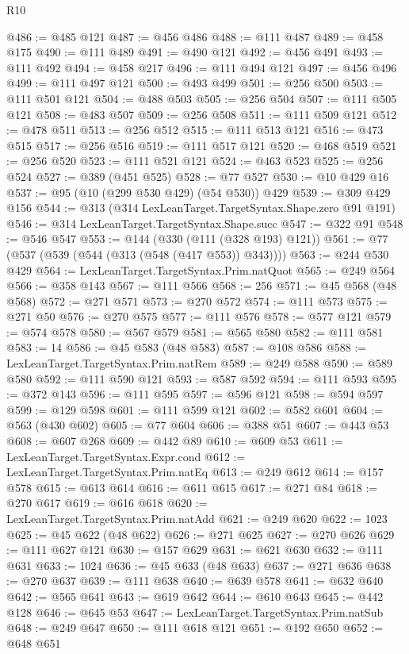 \begin{lexlean}{R10}
\begin{coremodule}
@486 := @485 @121
@487 := @456 @486
@488 := @111 @487
@489 := @458 @175
@490 := @111 @489
@491 := @490 @121
@492 := @456 @491
@493 := @111 @492
@494 := @458 @217
@496 := @111 @494 @121
@497 := @456 @496
@499 := @111 @497 @121
@500 := @493 @499
@501 := @256 @500
@503 := @111 @501 @121
@504 := @488 @503
@505 := @256 @504
@507 := @111 @505 @121
@508 := @483 @507
@509 := @256 @508
@511 := @111 @509 @121
@512 := @478 @511
@513 := @256 @512
@515 := @111 @513 @121
@516 := @473 @515
@517 := @256 @516
@519 := @111 @517 @121
@520 := @468 @519
@521 := @256 @520
@523 := @111 @521 @121
@524 := @463 @523
@525 := @256 @524
@527 := @389 (@451 @525)
@528 := @77 @527
@530 := @10 @429 @16
@537 := @95 (@10 (@299 @530 @429) (@54 @530)) @429
@539 := @309 @429 @156
@544 := @313 (@314 LexLeanTarget.TargetSyntax.Shape.zero @91 @191)
@546 := @314 LexLeanTarget.TargetSyntax.Shape.succ
@547 := @322 @91
@548 := @546 @547
@553 := @144 (@330 (@111 (@328 @193) @121))
@561 := @77 (@537 (@539 (@544 (@313 (@548 (@417 @553)) @343))))
@563 := @244 @530 @429
@564 := LexLeanTarget.TargetSyntax.Prim.natQuot
@565 := @249 @564
@566 := @358 @143
@567 := @111 @566
@568 := 256
@571 := @45 @568 (@48 @568)
@572 := @271 @571
@573 := @270 @572
@574 := @111 @573
@575 := @271 @50
@576 := @270 @575
@577 := @111 @576
@578 := @577 @121
@579 := @574 @578
@580 := @567 @579
@581 := @565 @580
@582 := @111 @581
@583 := 14
@586 := @45 @583 (@48 @583)
@587 := @108 @586
@588 := LexLeanTarget.TargetSyntax.Prim.natRem
@589 := @249 @588
@590 := @589 @580
@592 := @111 @590 @121
@593 := @587 @592
@594 := @111 @593
@595 := @372 @143
@596 := @111 @595
@597 := @596 @121
@598 := @594 @597
@599 := @129 @598
@601 := @111 @599 @121
@602 := @582 @601
@604 := @563 (@430 @602)
@605 := @77 @604
@606 := @388 @51
@607 := @443 @53
@608 := @607 @268
@609 := @442 @89
@610 := @609 @53
@611 := LexLeanTarget.TargetSyntax.Expr.cond
@612 := LexLeanTarget.TargetSyntax.Prim.natEq
@613 := @249 @612
@614 := @157 @578
@615 := @613 @614
@616 := @611 @615
@617 := @271 @84
@618 := @270 @617
@619 := @616 @618
@620 := LexLeanTarget.TargetSyntax.Prim.natAdd
@621 := @249 @620
@622 := 1023
@625 := @45 @622 (@48 @622)
@626 := @271 @625
@627 := @270 @626
@629 := @111 @627 @121
@630 := @157 @629
@631 := @621 @630
@632 := @111 @631
@633 := 1024
@636 := @45 @633 (@48 @633)
@637 := @271 @636
@638 := @270 @637
@639 := @111 @638
@640 := @639 @578
@641 := @632 @640
@642 := @565 @641
@643 := @619 @642
@644 := @610 @643
@645 := @442 @128
@646 := @645 @53
@647 := LexLeanTarget.TargetSyntax.Prim.natSub
@648 := @249 @647
@650 := @111 @618 @121
@651 := @192 @650
@652 := @648 @651

\end{coremodule}
\end{lexlean}
